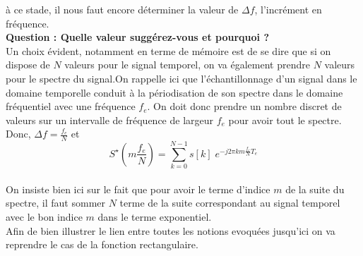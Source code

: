 \documentclass[11pt,a4paper]{article}
\begin{document}
à ce stade, il nous faut encore déterminer la valeur de $\Delta f$, l'incrément en fréquence.\\

\textbf{Question : Quelle valeur suggérez-vous et pourquoi ?}\\

Un choix évident, notamment en terme de mémoire est de se dire que si on dispose de $N$ valeurs pour le signal temporel, on va également prendre $N$ valeurs pour le spectre du signal.On rappelle ici que l'échantillonnage d'un signal dans le domaine temporelle conduit à la périodisation de son spectre dans le domaine fréquentiel avec une fréquence $f_e$. On doit donc prendre un nombre discret de valeurs sur un intervalle de fréquence de largeur $f_e$ pour avoir tout le spectre. Donc, $\Delta f = \frac{f_e}{N}$ et\\

\[S^{\star} (m \frac{f_e}{N}) = \sum_{k = 0}^{N-1} s[k] \; e^{-j 2 \pi k m \frac{f_e}{N} T_e} \]\\

On insiste bien ici sur le fait que pour avoir le terme d'indice $m$ de la suite du spectre, il faut sommer $N$ terme de la suite correspondant au signal temporel avec le bon indice $m$ dans le terme exponentiel.\\

Afin de bien illustrer le lien entre toutes les notions evoquées jusqu'ici on va reprendre le cas de la fonction rectangulaire.

\begin{center}
\end{center}
\end{document}
